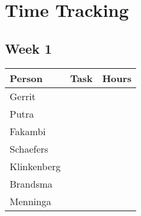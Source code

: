 \chapter*{Time Tracking}

\section*{Week 1}
\begin{tabularx}{\textwidth}{ l l l}
    \textbf{Person} & \textbf{Task} & Hours \\ \hline
	Gerrit & & \\
	Putra & & \\
	Fakambi & & \\
	Schaefers & & \\
	Klinkenberg & & \\
	Brandsma & & \\
	Menninga & & \\
\end{tabularx}